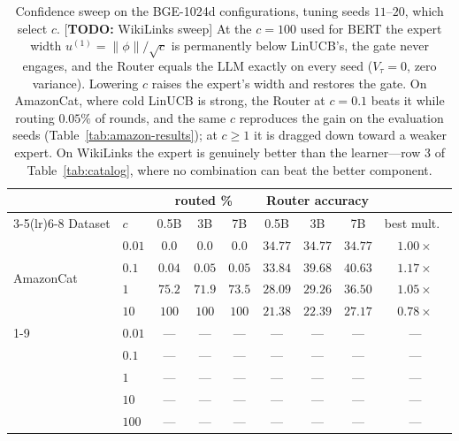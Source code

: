 \documentclass{article}
\theoremstyle{definition}
\theoremstyle{remark}
\theoremstyle{remark}
\newcommand{\todo}[1]{\textcolor{red!70!black}{[\textbf{TODO:} #1]}}
\begin{document}
\begin{table}[h]
\centering
\caption{Confidence sweep on the BGE-1024d configurations, tuning seeds
$11$--$20$, which select $c$. \todo{WikiLinks sweep} At the
$c=100$ used for BERT the expert width $u^{(1)}=\|\phi\|/\sqrt c$ is
permanently below LinUCB's, the gate never engages, and the Router equals the
LLM exactly on every seed ($V_\tau=0$, zero variance). Lowering $c$ raises the
expert's width and restores the gate. On AmazonCat, where cold LinUCB is
strong, the Router at $c=0.1$ beats it while routing $0.05\%$ of rounds, and
the same $c$ reproduces the gain on the evaluation seeds
(Table~\ref{tab:amazon-results}); at $c\ge1$ it is dragged down toward a
weaker expert. On WikiLinks the expert is
genuinely better than the learner---row 3 of Table~\ref{tab:catalog}, where no
combination can beat the better component.}
\label{tab:bge-csweep}
\scriptsize
\setlength{\tabcolsep}{4pt}
\begin{tabular}{@{}llccccccc@{}}
\toprule
& & \multicolumn{3}{c}{routed \%} & \multicolumn{3}{c}{Router accuracy} & \\
\cmidrule(lr){3-5}\cmidrule(lr){6-8}
Dataset & $c$ & 0.5B & 3B & 7B & 0.5B & 3B & 7B & best mult.\ \\
\midrule
\multirow{4}{*}{AmazonCat} & $0.01$ & $0.0$ & $0.0$ & $0.0$ & $34.77$ & $34.77$ & $34.77$ & $1.00\times$ \\
 & $\mathbf{0.1}$ & $0.04$ & $0.05$ & $0.05$ & $33.84$ & $39.68$ & $\mathbf{40.63}$ & $\mathbf{1.17\times}$ \\
 & $1$  & $75.2$ & $71.9$ & $73.5$ & $28.09$ & $29.26$ & $36.50$ & $1.05\times$ \\
 & $10$ & $100$ & $100$ & $100$ & $21.38$ & $22.39$ & $27.17$ & $0.78\times$ \\
\cmidrule(lr){1-9}
\multirow{5}{*}{WikiLinks} & $0.01$ & --- & --- & --- & --- & --- & --- & --- \\
 & $0.1$ & --- & --- & --- & --- & --- & --- & --- \\
 & $1$  & --- & --- & --- & --- & --- & --- & --- \\
 & $10$ & --- & --- & --- & --- & --- & --- & --- \\
 & $100$ & --- & --- & --- & --- & --- & --- & --- \\
\bottomrule
\end{tabular}
\end{table}
\end{document}
